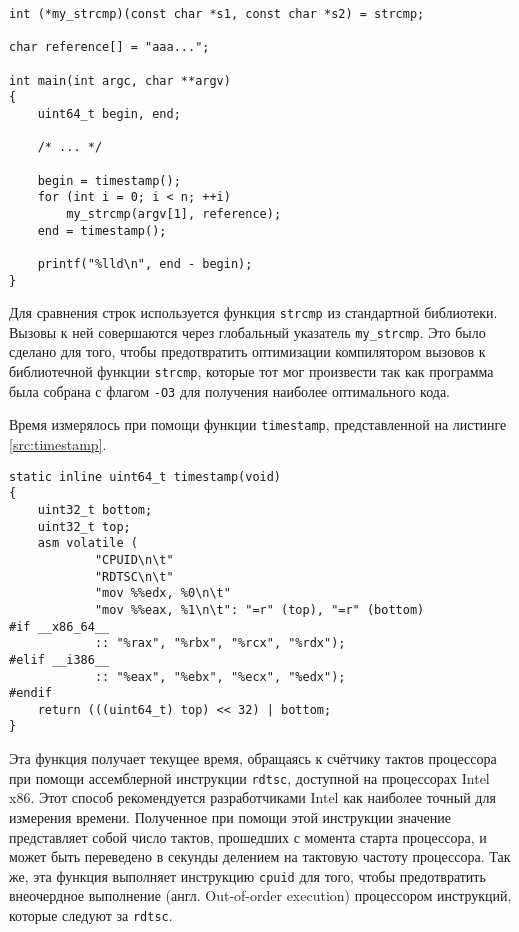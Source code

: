 \begin{lstlisting}[caption=Фрагмент программы \texttt{vulnerable.c}, label=src:vulnsnip]
int (*my_strcmp)(const char *s1, const char *s2) = strcmp;

char reference[] = "aaa...";

int main(int argc, char **argv)
{
	uint64_t begin, end;

	/* ... */

	begin = timestamp();
	for (int i = 0; i < n; ++i)
		my_strcmp(argv[1], reference);
	end = timestamp();

	printf("%lld\n", end - begin);
}
\end{lstlisting}

Для сравнения строк используется функция \texttt{strcmp} из стандартной
библиотеки. Вызовы к ней совершаются через глобальный указатель
\texttt{my\_strcmp}. Это было сделано для того, чтобы предотвратить оптимизации
компилятором вызовов к библиотечной функции \texttt{strcmp}, которые тот мог
произвести так как программа была собрана с флагом \texttt{-O3} для получения
наиболее оптимального кода.

Время измерялось при помощи функции \texttt{timestamp}, представленной на листинге
\ref{src:timestamp}.

\begin{lstlisting}[caption=Функция \texttt{timestamp}, label=src:timestamp]
static inline uint64_t timestamp(void)
{
	uint32_t bottom;
	uint32_t top;
	asm volatile (
			"CPUID\n\t"
			"RDTSC\n\t"
			"mov %%edx, %0\n\t"
			"mov %%eax, %1\n\t": "=r" (top), "=r" (bottom)
#if __x86_64__
			:: "%rax", "%rbx", "%rcx", "%rdx");
#elif __i386__
			:: "%eax", "%ebx", "%ecx", "%edx");
#endif
	return (((uint64_t) top) << 32) | bottom;
}
\end{lstlisting}

Эта функция получает текущее время, обращаясь к счётчику тактов процессора при
помощи ассемблерной инструкции \texttt{rdtsc}, доступной на процессорах Intel
x86. Этот способ рекомендуется разработчиками Intel \cite{rdtsc} как наиболее
точный для измерения времени. Полученное при помощи этой инструкции значение
представляет собой число тактов, прошедших с момента старта процессора, и
может быть переведено в секунды делением на тактовую частоту процессора. Так же,
эта функция выполняет инструкцию \texttt{cpuid} для того, чтобы предотвратить
внеочердное выполнение (англ. Out-of-order execution) процессором инструкций,
которые следуют за \texttt{rdtsc}.

